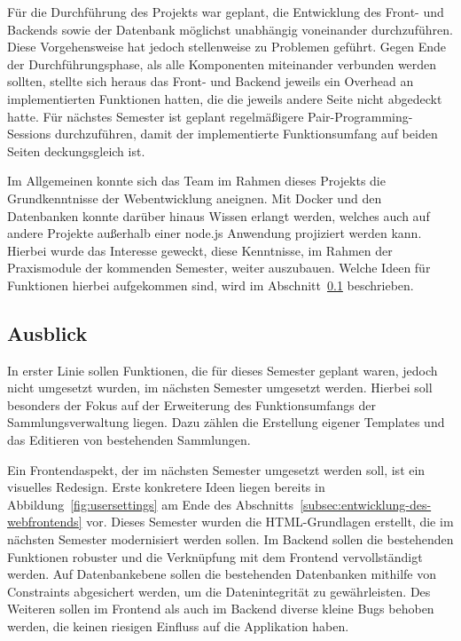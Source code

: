 Für die Durchführung des Projekts war geplant, die Entwicklung des Front- und Backends sowie der Datenbank möglichst unabhängig voneinander durchzuführen.
Diese Vorgehensweise hat jedoch stellenweise zu Problemen geführt.
Gegen Ende der Durchführungsphase, als alle Komponenten miteinander verbunden werden sollten, stellte sich heraus das Front- und Backend jeweils ein Overhead an implementierten Funktionen hatten, die die jeweils andere Seite nicht abgedeckt hatte.
Für nächstes Semester ist geplant regelmäßigere Pair-Programming-Sessions durchzuführen, damit der implementierte Funktionsumfang auf beiden Seiten deckungsgleich ist.

Im Allgemeinen konnte sich das Team im Rahmen dieses Projekts die Grundkenntnisse der Webentwicklung aneignen.
Mit Docker und den Datenbanken konnte darüber hinaus Wissen erlangt werden, welches auch auf andere Projekte außerhalb einer node.js Anwendung projiziert werden kann.
Hierbei wurde das Interesse geweckt, diese Kenntnisse, im Rahmen der Praxismodule der kommenden Semester, weiter auszubauen.
Welche Ideen für Funktionen hierbei aufgekommen sind, wird im Abschnitt~\ref{subsec:ausblick-zukuenftige-ziele-und-funktionen} beschrieben.

\subsection{Ausblick}\label{subsec:ausblick-zukuenftige-ziele-und-funktionen}

In erster Linie sollen Funktionen, die für dieses Semester geplant waren, jedoch nicht umgesetzt wurden, im nächsten Semester umgesetzt werden.
Hierbei soll besonders der Fokus auf der Erweiterung des Funktionsumfangs der Sammlungsverwaltung liegen.
Dazu zählen die Erstellung eigener Templates und das Editieren von bestehenden Sammlungen.

Ein Frontendaspekt, der im nächsten Semester umgesetzt werden soll, ist ein visuelles Redesign.
Erste konkretere Ideen liegen bereits in Abbildung~\ref{fig:usersettings} am Ende des Abschnitts~\ref{subsec:entwicklung-des-webfrontends} vor.
Dieses Semester wurden die HTML-Grundlagen erstellt, die im nächsten Semester modernisiert werden sollen.
Im Backend sollen die bestehenden Funktionen robuster und die Verknüpfung mit dem Frontend vervollständigt werden.
Auf Datenbankebene sollen die bestehenden Datenbanken mithilfe von Constraints abgesichert werden, um die Datenintegrität zu gewährleisten.
Des Weiteren sollen im Frontend als auch im Backend diverse kleine Bugs behoben werden, die keinen riesigen Einfluss auf die Applikation haben.

